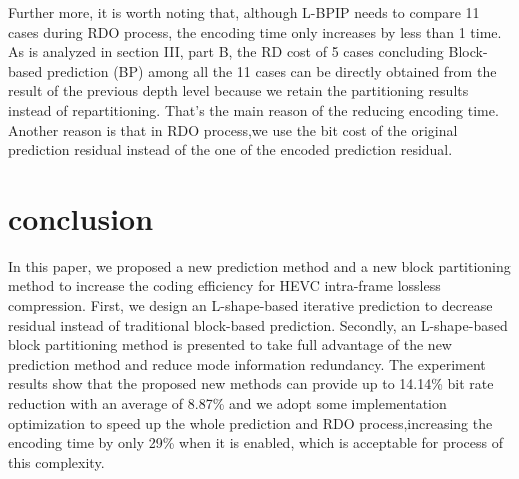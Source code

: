 \documentclass[journal]{IEEEtran}
\begin{document}
Further more, it is worth noting that, although L-BPIP needs to compare 11 cases during RDO process, the encoding time only increases by less than 1 time. As is analyzed in section III, part B, the RD cost of 5 cases concluding Block-based prediction (BP) among all the 11 cases can be directly obtained from the result of the previous depth level because we retain the partitioning results instead of repartitioning. That's the main reason of the reducing encoding time. Another reason is that in RDO process,we use the bit cost of the original prediction residual instead of the one of the encoded prediction residual.
\section{conclusion}
In this paper, we proposed a new prediction method and a new block partitioning method to increase the coding efficiency for HEVC intra-frame lossless compression. First, we design an L-shape-based iterative prediction to decrease residual instead of traditional block-based prediction. Secondly, an L-shape-based block partitioning method is presented to take full advantage of the new prediction method and reduce mode information redundancy. The experiment results show that the proposed new methods can provide up to 14.14\% bit rate reduction with an average of 8.87\% and we adopt some implementation optimization to speed up the whole prediction and RDO process,increasing the encoding time by only 29\% when it is enabled, which is acceptable for process of this complexity.

\ifCLASSOPTIONcaptionsoff
    \newpage
\fi


%
%
%


\end{document}
